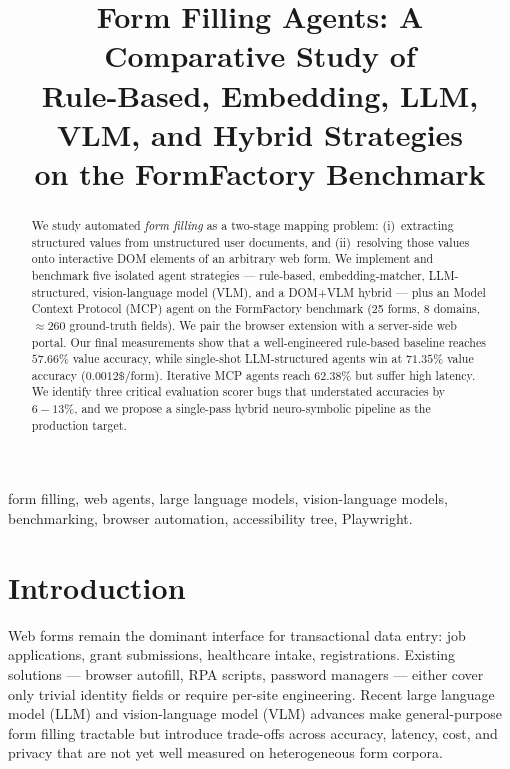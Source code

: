 \documentclass[conference]{IEEEtran}
\title{Form Filling Agents: A Comparative Study of\\
Rule-Based, Embedding, LLM, VLM, and Hybrid Strategies\\
on the FormFactory Benchmark}
\author{
  \IEEEauthorblockN{Yash Sarang}
  \IEEEauthorblockA{Independent Research \\
  Form Filling Agents Project \\
  IIT Bombay \\
  \texttt{yash.sarang@iitb.ac.in}}
}
\begin{document}
\maketitle

\begin{abstract}
We study automated \emph{form filling} as a two-stage mapping problem:
(i)~extracting structured values from unstructured user documents, and
(ii)~resolving those values onto interactive DOM elements of an arbitrary
web form. We implement and benchmark five isolated agent strategies ---
rule-based, embedding-matcher, LLM-structured, vision-language model
(VLM), and a DOM+VLM hybrid --- plus an Model Context Protocol (MCP) agent
on the FormFactory benchmark (25 forms, 8 domains, $\approx 260$ ground-truth
fields). We pair the browser extension with a server-side web portal.
Our final measurements show that a well-engineered rule-based baseline
reaches $57.66\%$ value accuracy, while single-shot LLM-structured agents
win at $71.35\%$ value accuracy ($0.0012\$$/form). Iterative MCP agents
reach $62.38\%$ but suffer high latency. We identify three critical evaluation
scorer bugs that understated accuracies by $6-13\%$, and we propose a
single-pass hybrid neuro-symbolic pipeline as the production target.
\end{abstract}

\begin{IEEEkeywords}
form filling, web agents, large language models, vision-language models,
benchmarking, browser automation, accessibility tree, Playwright.
\end{IEEEkeywords}

\section{Introduction}
Web forms remain the dominant interface for transactional data entry:
job applications, grant submissions, healthcare intake, registrations.
Existing solutions --- browser autofill, RPA scripts, password managers
--- either cover only trivial identity fields or require per-site
engineering. Recent large language model (LLM) and vision-language model
(VLM) advances make general-purpose form filling tractable but introduce
trade-offs across accuracy, latency, cost, and privacy that are not yet
well measured on heterogeneous form corpora.
\end{document}
